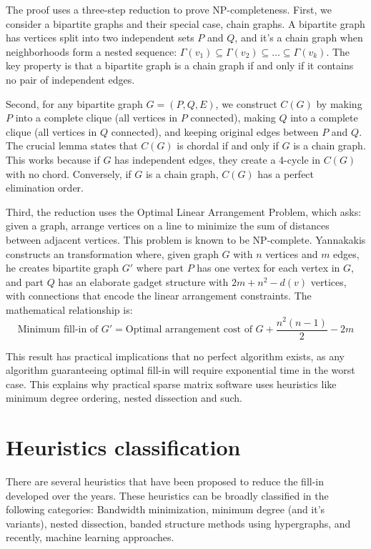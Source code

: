 The proof uses a three-step reduction to prove NP-completeness. First, we consider a bipartite graphs and their special case, chain graphs. A bipartite graph has vertices split into two independent sets $P$ and $Q$, and it's a chain graph when neighborhoods form a nested sequence: $\Gamma(v_1) \subseteq \Gamma(v_2) \subseteq \ldots \subseteq \Gamma(v_k)$. The key property is that a bipartite graph is a chain graph if and only if it contains no pair of independent edges.

Second, for any bipartite graph $G = (P, Q, E)$, we construct $C(G)$ by making $P$ into a complete clique (all vertices in $P$ connected), making $Q$ into a complete clique (all vertices in $Q$ connected), and keeping original edges between $P$ and $Q$. The crucial lemma states that $C(G)$ is chordal if and only if $G$ is a chain graph. This works because if $G$ has independent edges, they create a 4-cycle in $C(G)$ with no chord. Conversely, if $G$ is a chain graph, $C(G)$ has a perfect elimination order.

Third, the reduction uses the Optimal Linear Arrangement Problem, which asks: given a graph, arrange vertices on a line to minimize the sum of distances between adjacent vertices. This problem is known to be NP-complete. Yannakakis constructs an transformation where, given graph $G$ with $n$ vertices and $m$ edges, he creates bipartite graph $G'$ where part $P$ has one vertex for each vertex in $G$, and part $Q$ has an elaborate gadget structure with $2m + n^2 - d(v)$ vertices, with connections that encode the linear arrangement constraints. The mathematical relationship is:
\begin{equation}
\text{Minimum fill-in of } G' = \text{Optimal arrangement cost of } G + \frac{n^2(n-1)}{2} - 2m
\end{equation}

This result has practical implications that no perfect algorithm exists, as any algorithm guaranteeing optimal fill-in will require exponential time in the worst case. This explains why practical sparse matrix software uses heuristics like minimum degree ordering, nested dissection and such.

\section{Heuristics classification}
\label{sec:heuristics}

There are several heuristics that have been proposed to reduce the fill-in developed over the years. These heuristics can be broadly classified in the following categories: Bandwidth minimization, minimum degree (and it's variants), nested dissection, banded structure methods using hypergraphs, and recently, machine learning approaches. 

